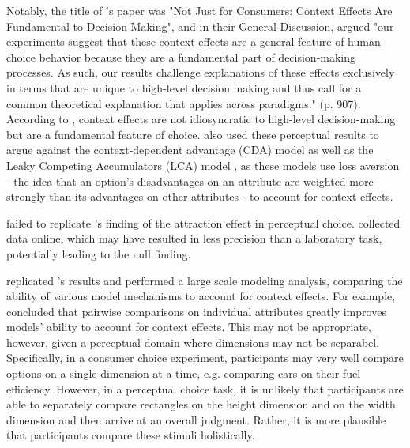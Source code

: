 Notably, the title of \textcite{trueblood2013not}'s paper was "Not Just for Consumers: Context Effects Are Fundamental to Decision Making", and in their General Discussion, \textcite{trueblood2013not} argued "our experiments suggest that these context effects are a general feature of human choice behavior because they are a fundamental part of decision-making processes. As such, our results challenge explanations of these effects exclusively in terms that are unique to high-level decision making and thus call for a common theoretical explanation that applies across paradigms." (p. 907). According to \textcite{trueblood2013not}, context effects are not idiosyncratic to high-level decision-making but are a fundamental feature of choice. \textcite{trueblood2013not} also used these perceptual results to argue against the context-dependent advantage (CDA) model \parencite{tversky1993context} as well as the Leaky Competing Accumulators (LCA) model \parencite{usherLossAversionInhibition2004a}, as these models use loss aversion - the idea that an option's disadvantages on an attribute are weighted more strongly than its advantages on other attributes - to account for context effects. 

\textcite{frederickLimitsAttraction2014b} failed to replicate \textcite{trueblood2013not}'s finding of the attraction effect in perceptual choice. \textcite{frederickLimitsAttraction2014b} collected data online, which may have resulted in less precision than a laboratory task, potentially leading to the null finding.

\textcite{turnerCompetingTheoriesMultialternative2018a} replicated \textcite{trueblood2013not}'s results and performed a large scale modeling analysis, comparing the ability of various model mechanisms to account for context effects. For example, \textcite{turnerCompetingTheoriesMultialternative2018a} concluded that pairwise comparisons on individual attributes greatly improves models' ability to account for context effects. This may not be appropriate, however, given a perceptual domain where dimensions may not be separabel. Specifically, in a consumer choice experiment, participants may very well compare options on a single dimension at a time, e.g. comparing cars on their fuel efficiency. However, in a perceptual choice task, it is unlikely that participants are able to separately compare rectangles on the height dimension and on the width dimension and then arrive at an overall judgment. Rather, it is more plausible that participants compare these stimuli holistically.

